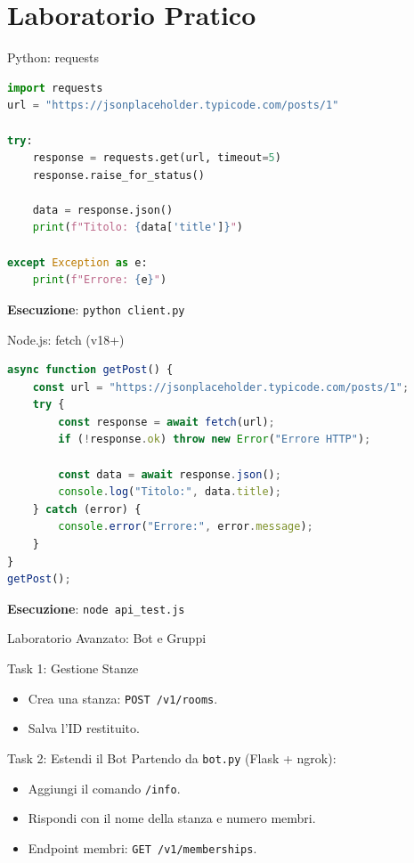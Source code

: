 \documentclass[10pt]{beamer}
\begin{document}
\section{Laboratorio Pratico}

\begin{frame}[fragile]{Python: requests}
    \begin{lstlisting}[language=python]
import requests
url = "https://jsonplaceholder.typicode.com/posts/1"

try:
    response = requests.get(url, timeout=5)
    response.raise_for_status() 
    
    data = response.json()
    print(f"Titolo: {data['title']}")

except Exception as e:
    print(f"Errore: {e}")
    \end{lstlisting}
    \textbf{Esecuzione}: \texttt{python client.py}
\end{frame}

\begin{frame}[fragile]{Node.js: fetch (v18+)}
    \begin{lstlisting}[language=javascript]
async function getPost() {
    const url = "https://jsonplaceholder.typicode.com/posts/1";
    try {
        const response = await fetch(url);
        if (!response.ok) throw new Error("Errore HTTP");

        const data = await response.json();
        console.log("Titolo:", data.title);
    } catch (error) {
        console.error("Errore:", error.message);
    }
}
getPost();
    \end{lstlisting}
    \textbf{Esecuzione}: \texttt{node api\_test.js}
\end{frame}

\begin{frame}{Laboratorio Avanzato: Bot e Gruppi}
    \begin{block}{Task 1: Gestione Stanze}
        \begin{itemize}
            \item Crea una stanza: \texttt{POST /v1/rooms}.
            \item Salva l'ID restituito.
        \end{itemize}
    \end{block}
    \begin{block}{Task 2: Estendi il Bot}
        Partendo da \texttt{bot.py} (Flask + ngrok):
        \begin{itemize}
            \item Aggiungi il comando \texttt{/info}.
            \item Rispondi con il nome della stanza e numero membri.
            \item Endpoint membri: \texttt{GET /v1/memberships}.
        \end{itemize}
    \end{block}
\end{frame}
\end{document}
